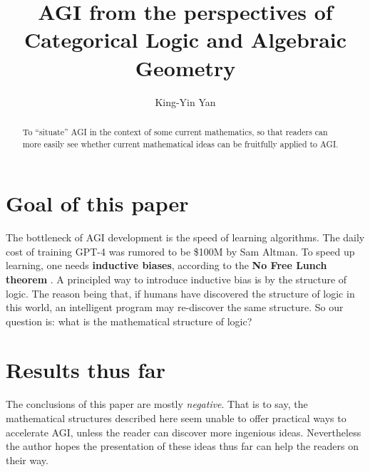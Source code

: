 \documentclass[runningheads]{llncs}
\begin{document}
%
\title{AGI from the perspectives of Categorical Logic and Algebraic Geometry}
%
%
\author{King-Yin Yan }
%
%
%
\maketitle              %
%
\begin{abstract}
To ``situate'' AGI in the context of some current mathematics, so that readers can more easily see whether current mathematical ideas can be fruitfully applied to AGI.

\end{abstract}
%
%
%
\section{Goal of this paper}

The bottleneck of AGI development is the speed of learning algorithms.  The daily cost of training GPT-4 was rumored to be \$100M by Sam Altman.  To speed up learning, one needs \textbf{inductive biases}, according to the \textbf{No Free Lunch theorem} \cite{Wolpert1997} \cite{Wikipedia-no-free-lunch}.  A principled way to introduce inductive bias is by the structure of logic.  The reason being that, if humans have discovered the structure of logic in this world, an intelligent program may re-discover the same structure.  So our question is:  what is the mathematical structure of logic?


\section{Results thus far}

The conclusions of this paper are mostly \textit{negative}.  That is to say, the mathematical structures described here seem unable to offer practical ways to accelerate AGI, unless the reader can discover more ingenious ideas.  Nevertheless the author hopes the presentation of these ideas thus far can help the readers on their way.
\end{document}
